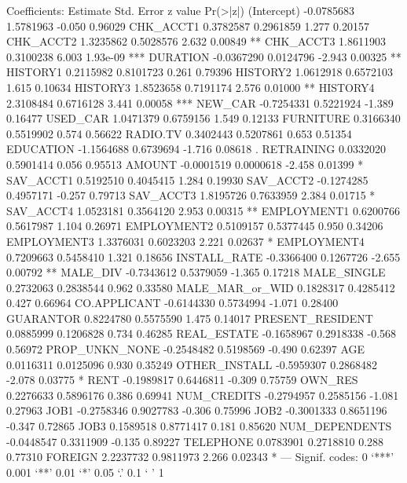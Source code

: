 \documentclass{article}
\begin{document}
\begin{Schunk}
\begin{Soutput}
Coefficients:
                   Estimate Std. Error z value Pr(>|z|)    
(Intercept)      -0.0785683  1.5781963  -0.050  0.96029    
CHK_ACCT1         0.3782587  0.2961859   1.277  0.20157    
CHK_ACCT2         1.3235862  0.5028576   2.632  0.00849 ** 
CHK_ACCT3         1.8611903  0.3100238   6.003 1.93e-09 ***
DURATION         -0.0367290  0.0124796  -2.943  0.00325 ** 
HISTORY1          0.2115982  0.8101723   0.261  0.79396    
HISTORY2          1.0612918  0.6572103   1.615  0.10634    
HISTORY3          1.8523658  0.7191174   2.576  0.01000 ** 
HISTORY4          2.3108484  0.6716128   3.441  0.00058 ***
NEW_CAR          -0.7254331  0.5221924  -1.389  0.16477    
USED_CAR          1.0471379  0.6759156   1.549  0.12133    
FURNITURE         0.3166340  0.5519902   0.574  0.56622    
RADIO.TV          0.3402443  0.5207861   0.653  0.51354    
EDUCATION        -1.1564688  0.6739694  -1.716  0.08618 .  
RETRAINING        0.0332020  0.5901414   0.056  0.95513    
AMOUNT           -0.0001519  0.0000618  -2.458  0.01399 *  
SAV_ACCT1         0.5192510  0.4045415   1.284  0.19930    
SAV_ACCT2        -0.1274285  0.4957171  -0.257  0.79713    
SAV_ACCT3         1.8195726  0.7633959   2.384  0.01715 *  
SAV_ACCT4         1.0523181  0.3564120   2.953  0.00315 ** 
EMPLOYMENT1       0.6200766  0.5617987   1.104  0.26971    
EMPLOYMENT2       0.5109157  0.5377445   0.950  0.34206    
EMPLOYMENT3       1.3376031  0.6023203   2.221  0.02637 *  
EMPLOYMENT4       0.7209663  0.5458410   1.321  0.18656    
INSTALL_RATE     -0.3366400  0.1267726  -2.655  0.00792 ** 
MALE_DIV         -0.7343612  0.5379059  -1.365  0.17218    
MALE_SINGLE       0.2732063  0.2838544   0.962  0.33580    
MALE_MAR_or_WID   0.1828317  0.4285412   0.427  0.66964    
CO.APPLICANT     -0.6144330  0.5734994  -1.071  0.28400    
GUARANTOR         0.8224780  0.5575590   1.475  0.14017    
PRESENT_RESIDENT  0.0885999  0.1206828   0.734  0.46285    
REAL_ESTATE      -0.1658967  0.2918338  -0.568  0.56972    
PROP_UNKN_NONE   -0.2548482  0.5198569  -0.490  0.62397    
AGE               0.0116311  0.0125096   0.930  0.35249    
OTHER_INSTALL    -0.5959307  0.2868482  -2.078  0.03775 *  
RENT             -0.1989817  0.6446811  -0.309  0.75759    
OWN_RES           0.2276633  0.5896176   0.386  0.69941    
NUM_CREDITS      -0.2794957  0.2585156  -1.081  0.27963    
JOB1             -0.2758346  0.9027783  -0.306  0.75996    
JOB2             -0.3001333  0.8651196  -0.347  0.72865    
JOB3              0.1589518  0.8771417   0.181  0.85620    
NUM_DEPENDENTS   -0.0448547  0.3311909  -0.135  0.89227    
TELEPHONE         0.0783901  0.2718810   0.288  0.77310    
FOREIGN           2.2237732  0.9811973   2.266  0.02343 *  
---
Signif. codes:  0 ‘***’ 0.001 ‘**’ 0.01 ‘*’ 0.05 ‘.’ 0.1 ‘ ’ 1


\end{Soutput}
\end{Schunk}
\end{document}
